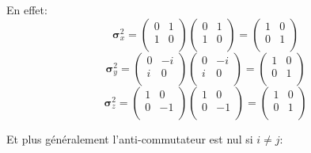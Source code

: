 \documentclass[12pt,a4paper]{article}
\begin{document}
	En effet:
	\[
	\bm{\sigma}_x^2=\begin{pmatrix}
	0&1\\
	1&0\\
	\end{pmatrix}
	\begin{pmatrix}
	0&1\\
	1&0\\
	\end{pmatrix}
	=
	\begin{pmatrix}
	1&0\\
	0&1\\
	\end{pmatrix}
	\]
	\[
	\bm{\sigma}_y^2=\begin{pmatrix}
	0&-i\\
	i&0\\
	\end{pmatrix}
	\begin{pmatrix}
	0&-i\\
	i&0\\
	\end{pmatrix}
	=
	\begin{pmatrix}
	1&0\\
	0&1\\
	\end{pmatrix}
	\]
	\[
	\bm{\sigma}_z^2=\begin{pmatrix}
	1&0\\
	0&-1\\
	\end{pmatrix}
	\begin{pmatrix}
	1&0\\
	0&-1\\
	\end{pmatrix}
	=
	\begin{pmatrix}
	1&0\\
	0&1\\
	\end{pmatrix}
	\]
	
	Et plus généralement l'anti-commutateur est nul si $i\ne j$:
	
\end{document}
